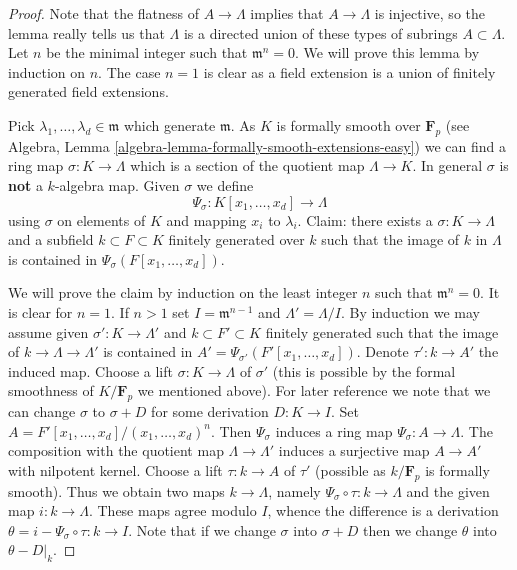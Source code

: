 \begin{proof}
Note that the flatness of $A \to \Lambda$ implies that $A \to \Lambda$
is injective, so the lemma really tells us that $\Lambda$ is a
directed union of these types of subrings $A \subset \Lambda$.
Let $n$ be the minimal integer such that $\mathfrak m^n = 0$.
We will prove this lemma by induction on $n$. The case $n = 1$ is clear
as a field extension is a union of finitely generated field extensions.

\medskip\noindent
Pick $\lambda_1, \ldots, \lambda_d \in \mathfrak m$ which generate
$\mathfrak m$. As $K$ is formally smooth over $\mathbf{F}_p$ (see
Algebra, Lemma \ref{algebra-lemma-formally-smooth-extensions-easy}) we can
find a ring map $\sigma : K \to \Lambda$ which is a section of the
quotient map $\Lambda \to K$. In general $\sigma$ is {\bf not}
a $k$-algebra map. Given $\sigma$ we define
$$
\Psi_\sigma : K[x_1, \ldots, x_d] \longrightarrow \Lambda
$$
using $\sigma$ on elements of $K$ and mapping $x_i$ to $\lambda_i$.
Claim: there exists a $\sigma : K \to \Lambda$
and a subfield $k \subset F \subset K$ finitely generated over $k$
such that the image of $k$ in $\Lambda$ is contained in
$\Psi_\sigma(F[x_1, \ldots, x_d])$.

\medskip\noindent
We will prove the claim by induction on the least integer $n$ such that
$\mathfrak m^n = 0$. It is clear for $n = 1$. If $n > 1$ set
$I = \mathfrak m^{n - 1}$ and $\Lambda' = \Lambda/I$.
By induction we may assume
given $\sigma' : K \to \Lambda'$ and $k \subset F' \subset K$ finitely
generated such that the image of $k \to \Lambda \to \Lambda'$
is contained in $A' = \Psi_{\sigma'}(F'[x_1, \ldots, x_d])$.
Denote $\tau' : k \to A'$ the induced map.
Choose a lift $\sigma : K \to \Lambda$ of $\sigma'$ (this is possible
by the formal smoothness of $K/\mathbf{F}_p$ we mentioned above).
For later reference we note that we can change $\sigma$ to
$\sigma + D$ for some derivation $D : K \to I$.
Set $A = F'[x_1, \ldots, x_d]/(x_1, \ldots, x_d)^n$.
Then $\Psi_\sigma$ induces a ring map
$\Psi_\sigma : A \to \Lambda$. The composition with the
quotient map $\Lambda \to \Lambda'$ induces a surjective
map $A \to A'$ with nilpotent kernel.
Choose a lift $\tau : k \to A$ of $\tau'$ (possible as $k/\mathbf{F}_p$
is formally smooth). Thus we obtain two maps $k \to \Lambda$, namely
$\Psi_\sigma \circ \tau : k \to \Lambda$ and the given map $i : k \to \Lambda$.
These maps agree modulo $I$, whence the difference is a
derivation $\theta = i - \Psi_\sigma \circ \tau : k \to I$.
Note that if we change $\sigma$ into $\sigma + D$ then we change
$\theta$ into $\theta - D|_k$.


\end{proof}
